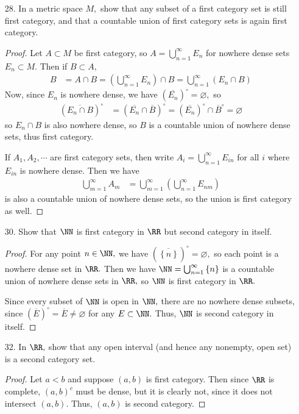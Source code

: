 \documentclass{article}
\begin{document}
\begin{itemize}
	\item[28.] In a metric space $M,$ show that any subset of a first category set is still first category, and that a countable union of first category sets is again first category.
		\begin{proof}
			Let $A\subset M$ be first category, so $A=\bigcup_{n=1}^\infty E_n$ for nowhere dense sets $E_n\subset M.$ Then if $B\subset A,$
			\begin{align*}
				B &= A\cap B = \left( \bigcup_{n=1}^\infty E_n \right)\cap B = \bigcup_{n=1}^\infty (E_n\cap B)
			\end{align*}
			Now, since $E_n$ is nowhere dense, we have $\left( \overline{E_n} \right)^\circ=\varnothing,$ so
			\begin{align*}
				\left( \overline{E_n\cap B} \right)^\circ &= \left( \overline{E_n}\cap \overline{B} \right)^\circ = \left( \overline{E_n} \right)^\circ\cap \overline{B}^\circ = \varnothing
			\end{align*}
			so $E_n\cap B$ is also nowhere dense, so $B$ is a countable union of nowhere dense sets, thus first category.

			If $A_1, A_2, \cdots$ are first category sets, then write $A_i=\bigcup_{n=1}^\infty E_{in}$ for all $i$ where $E_{in}$ is nowhere dense. Then we have
			\begin{align*}
				\bigcup_{m=1}^\infty A_m &= \bigcup_{m=1}^\infty \left( \bigcup_{n=1}^\infty E_{nm} \right)
			\end{align*}
			is also a countable union of nowhere dense sets, so the union is first category as well.
		\end{proof}
		
	\item[30.] Show that $\NN$ is first category in $\RR$ but second category in itself.
		\begin{proof}
			For any point $n\in \NN,$ we have $\left( \overline{ \left\{ n \right\}} \right)^\circ=\varnothing,$ so each point is a nowhere dense set in $\RR.$ Then we have $\NN = \bigcup_{n=1}^\infty \left\{ n \right\}$ is a countable union of nowhere dense sets in $\RR,$ so $\NN$ is first category in $\RR.$

			Since every subset of $\NN$ is open in $\NN,$ there are no nowhere dense subsets, since $(\overline E)^\circ=\overline E\neq\varnothing$ for any $E\subset \NN.$ Thus, $\NN$ is second category in itself.
		\end{proof}

	\item[32.] In $\RR,$ show that any open interval (and hence any nonempty, open set) is a second category set.
		\begin{proof}
			Let $a<b$ and suppose $(a, b)$ is first category. Then since $\RR$ is complete, $(a, b)^c$ must be dense, but it is clearly not, since it does not intersect $(a, b).$ Thus, $(a, b)$ is second category.
		\end{proof}


\end{itemize}
\end{document}
